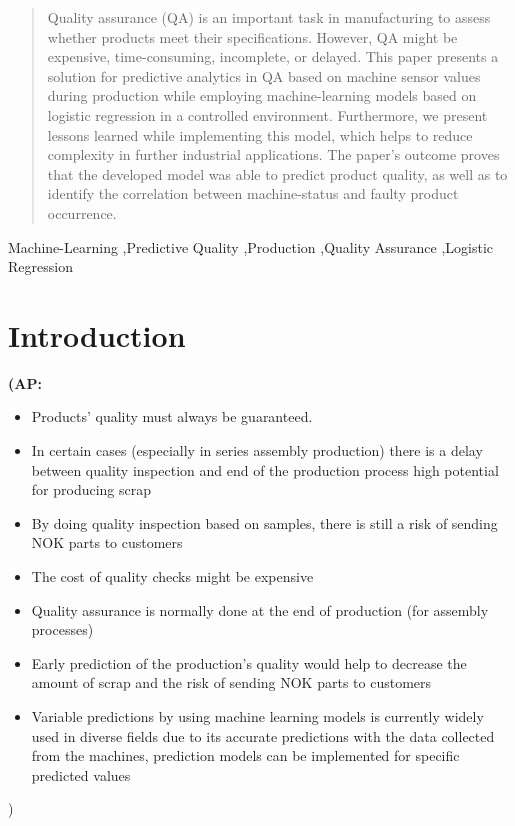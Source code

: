 \documentclass[5p,times,procedia]{elsarticle}
\newcommand{\AP}[1]{{\color{blue} {\bf (AP: #1)}}}
\begin{document}
\begin{frontmatter}
\begin{abstract}
Quality assurance (QA) is an important task in manufacturing to assess whether products 
meet their specifications. However, QA might be expensive, time-consuming, incomplete, or delayed.
This paper presents a solution for predictive analytics in QA based on machine sensor values during
production while employing machine-learning models based on logistic regression in a controlled environment. 
Furthermore, we present lessons learned while implementing this model, which helps to reduce complexity in
further industrial applications. The paper’s outcome proves that the developed model was able to predict
product quality, as well as to identify the correlation between machine-status and faulty product occurrence.
\end{abstract}

\begin{keyword}
Machine-Learning \sep Predictive Quality \sep Production \sep Quality Assurance \sep Logistic Regression 




\end{keyword}

\end{frontmatter}


\section{Introduction} %

\AP{\begin{itemize}
       \item	Products’ quality must always be guaranteed.
       \item	In certain cases (especially in series assembly production) there is a delay between quality inspection
              and end of the production process high potential for producing scrap 
       \item	By doing quality inspection based on samples, there is still a risk of sending NOK parts to customers
       \item	The cost of quality checks might be expensive
       \item	Quality assurance is normally done at the end of production (for assembly processes)   
       \item	Early prediction of the production’s quality  would help to decrease the amount of scrap  and the risk of sending NOK parts to customers
       \item	Variable predictions by using machine learning models is currently widely used in diverse fields due to its accurate predictions with the data collected from the machines, 
              prediction models can be implemented for specific predicted values
\end{itemize}}
\end{document}
